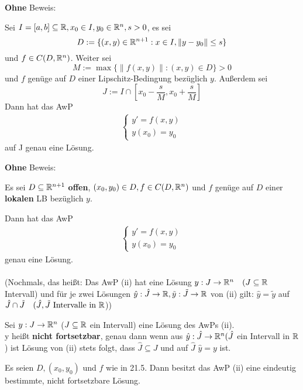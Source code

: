 \documentclass[a4paper,twoside,DIV15,BCOR12mm,chapterprefix=true,headings=twolinechapter]{scrbook}
\begin{document}
\textbf{Ohne} Beweis:
\begin{satz}
Sei $I=[a,b] \subseteq \mathbb{R}, x_0 \in I, y_0 \in \mathbb{R}^n, s > 0$, es sei
\[D := \{(x,y)\in\mathbb{R}^{n+1} : x \in I, \|y-y_0\| \leq s\}\] 
und $f \in C(D,\mathbb{R}^n)$. Weiter sei 
\[M := \max\{\|f(x,y)\| : (x,y) \in D \} > 0\] 
und $f$ genüge auf $D$ einer Lipschitz-Bedingung bezüglich $y$. 
Außerdem sei 
\[J := I \cap [x_0 - \frac{s}{M}, x_0 + \frac{s}{M}]\]
Dann hat das AwP
\begin{align*} \begin{cases}
y' = f(x,y)\\
y(x_0) = y_0
\end{cases}
\label{(ii)}
\end{align*}
auf J genau eine Lösung.
\end{satz}

\textbf{Ohne} Beweis:
\begin{satz}
Es sei $D \subseteq \mathbb{R}^{n+1}$ \textbf{offen}, $(x_0, y_0) \in D, f\in C(D, \mathbb{R}^n)$ und $f$ genüge auf $D$ einer \textbf{lokalen} LB bezüglich $y$.

Dann hat das AwP
\begin{align*} \begin{cases}
y' = f(x,y)\\
y(x_0) = y_0
\end{cases}
\label{(ii)}
\end{align*}
genau eine Lösung.
\\
\\
(Nochmals, das heißt: Das AwP (ii) hat eine Lösung $y: J \to \mathbb{R}^n\quad(J \subseteq \mathbb{R}$ 
Intervall) und für je zwei Lösungen $\hat y : \hat J \to \mathbb{R}, \tilde y : \tilde J \to \mathbb{R}$ 
von (ii) gilt: $\hat y = \tilde y$ auf $\hat J \cap \tilde J \quad (\hat J, \tilde J \text{ Intervalle in } \mathbb{R}$))
\end{satz}

\begin{definition}
Sei $y: J \to \mathbb{R}^n$ ($J \subseteq \mathbb{R}$ ein Intervall) eine Lösung des AwPs (ii).\\
y heißt \textbf{nicht fortsetzbar}, genau dann wenn aus $\hat y : \hat J \to \mathbb{R}^n 
(\hat J$ ein Intervall in $\mathbb{R}$) ist Lösung von (ii) stets folgt, dass $\hat J \subseteq J$ 
und auf $\hat J$ $\hat y = y$ ist.
\end{definition}

\begin{satz}
Es seien $D, (x_0, y_0)$ und $f$ wie in 21.5. Dann besitzt das AwP (ii) eine eindeutig bestimmte, nicht fortsetzbare Lösung.
\end{satz}
\end{document}

